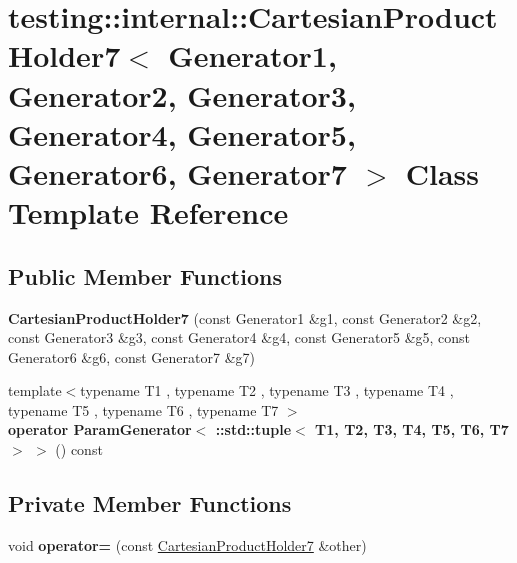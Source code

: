 \hypertarget{classtesting_1_1internal_1_1_cartesian_product_holder7}{}\section{testing\+:\+:internal\+:\+:Cartesian\+Product\+Holder7$<$ Generator1, Generator2, Generator3, Generator4, Generator5, Generator6, Generator7 $>$ Class Template Reference}
\label{classtesting_1_1internal_1_1_cartesian_product_holder7}
\subsection*{Public Member Functions}
\begin{DoxyCompactItemize}
\item 
\mbox{\label{classtesting_1_1internal_1_1_cartesian_product_holder7_a289e661f9252bac3570700410eb041b3}} 
{\bfseries Cartesian\+Product\+Holder7} (const Generator1 \&g1, const Generator2 \&g2, const Generator3 \&g3, const Generator4 \&g4, const Generator5 \&g5, const Generator6 \&g6, const Generator7 \&g7)
\item 
\mbox{\label{classtesting_1_1internal_1_1_cartesian_product_holder7_aef46f61ddac11f5daaf7ba59b0616c36}} 
{\footnotesize template$<$typename T1 , typename T2 , typename T3 , typename T4 , typename T5 , typename T6 , typename T7 $>$ }\\{\bfseries operator Param\+Generator$<$ \+::std\+::tuple$<$ T1, T2, T3, T4, T5, T6, T7 $>$ $>$} () const
\end{DoxyCompactItemize}
\subsection*{Private Member Functions}
\begin{DoxyCompactItemize}
\item 
\mbox{\label{classtesting_1_1internal_1_1_cartesian_product_holder7_ad8258962ad29b1caa12c190829f812fe}} 
void {\bfseries operator=} (const \mbox{\hyperlink{classtesting_1_1internal_1_1_cartesian_product_holder7}{Cartesian\+Product\+Holder7}} \&other)
\end{DoxyCompactItemize}
